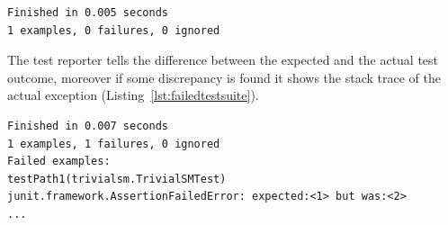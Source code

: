 \begin{description}
\begin{lstlisting}[label={lst:successfultestsuite}, caption=Successful test suite execution output,breaklines=true]
Finished in 0.005 seconds
1 examples, 0 failures, 0 ignored
\end{lstlisting}
	
	The test reporter tells the difference between the expected and the actual test outcome, moreover if some discrepancy is found it shows the stack trace of the actual exception (Listing~\ref{lst:failedtestsuite}).

\begin{lstlisting}[label={lst:failedtestsuite}, caption=Failed test suite execution output,breaklines=true]
Finished in 0.007 seconds
1 examples, 1 failures, 0 ignored
Failed examples:
testPath1(trivialsm.TrivialSMTest)
junit.framework.AssertionFailedError: expected:<1> but was:<2>
...
\end{lstlisting}
	
\end{description}
	

